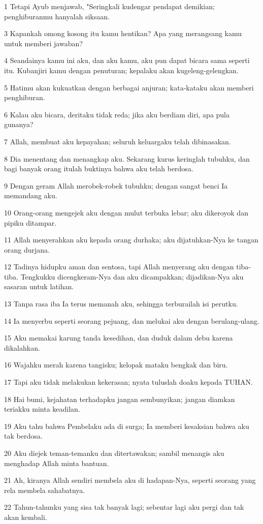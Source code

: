 \par 1 Tetapi Ayub menjawab, "Seringkali kudengar pendapat demikian; penghiburanmu hanyalah siksaan.
\par 3 Kapankah omong kosong itu kamu hentikan? Apa yang merangsang kamu untuk memberi jawaban?
\par 4 Seandainya kamu ini aku, dan aku kamu, aku pun dapat bicara sama seperti itu. Kubanjiri kamu dengan penuturan; kepalaku akan kugeleng-gelengkan.
\par 5 Hatimu akan kukuatkan dengan berbagai anjuran; kata-kataku akan memberi penghiburan.
\par 6 Kalau aku bicara, deritaku tidak reda; jika aku berdiam diri, apa pula gunanya?
\par 7 Allah, membuat aku kepayahan; seluruh keluargaku telah dibinasakan.
\par 8 Dia menentang dan menangkap aku. Sekarang kurus keringlah tubuhku, dan bagi banyak orang itulah buktinya bahwa aku telah berdosa.
\par 9 Dengan geram Allah merobek-robek tubuhku; dengan sangat benci Ia memandang aku.
\par 10 Orang-orang mengejek aku dengan mulut terbuka lebar; aku dikeroyok dan pipiku ditampar.
\par 11 Allah menyerahkan aku kepada orang durhaka; aku dijatuhkan-Nya ke tangan orang durjana.
\par 12 Tadinya hidupku aman dan sentosa, tapi Allah menyerang aku dengan tiba-tiba. Tengkukku dicengkeram-Nya dan aku dicampakkan; dijadikan-Nya aku sasaran untuk latihan.
\par 13 Tanpa rasa iba Ia terus memanah aku, sehingga terburailah isi perutku.
\par 14 Ia menyerbu seperti seorang pejuang, dan melukai aku dengan berulang-ulang.
\par 15 Aku memakai karung tanda kesedihan, dan duduk dalam debu karena dikalahkan.
\par 16 Wajahku merah karena tangisku; kelopak mataku bengkak dan biru.
\par 17 Tapi aku tidak melakukan kekerasan; nyata tuluslah doaku kepada TUHAN.
\par 18 Hai bumi, kejahatan terhadapku jangan sembunyikan; jangan diamkan teriakku minta keadilan.
\par 19 Aku tahu bahwa Pembelaku ada di surga; Ia memberi kesaksian bahwa aku tak berdosa.
\par 20 Aku diejek teman-temanku dan ditertawakan; sambil menangis aku menghadap Allah minta bantuan.
\par 21 Ah, kiranya Allah sendiri membela aku di hadapan-Nya, seperti seorang yang rela membela sahabatnya.
\par 22 Tahun-tahunku yang sisa tak banyak lagi; sebentar lagi aku pergi dan tak akan kembali.

